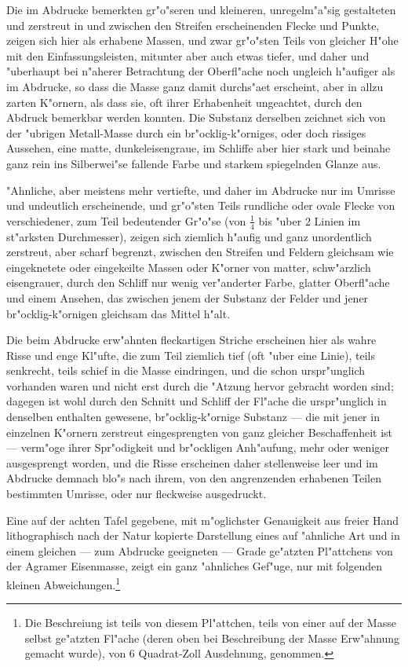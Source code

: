 \documentclass[a4paper, 11pt, oneside, german]{article}
\begin{document}
Die im Abdrucke bemerkten gr"o"seren und kleineren, unregelm"a"sig gestalteten und zerstreut in und zwischen den Streifen erscheinenden Flecke und Punkte, zeigen sich hier als erhabene Massen, und zwar gr"o"sten Teils von gleicher H"ohe mit den Einfassungsleisten, mitunter aber auch etwas tiefer, und daher und "uberhaupt bei n"aherer Betrachtung der Oberfl"ache noch ungleich h"aufiger als im Abdrucke, so dass die Masse ganz damit durchs"aet erscheint, aber in allzu zarten K"ornern, als dass sie, oft ihrer Erhabenheit ungeachtet, durch den Abdruck bemerkbar werden konnten. Die Substanz derselben zeichnet sich von der "ubrigen Metall-Masse durch ein br"ocklig-k"orniges, oder doch rissiges Aussehen, eine matte, dunkeleisengraue, im Schliffe aber hier stark und beinahe ganz rein ins Silberwei"se fallende Farbe und starkem spiegelnden Glanze aus.

"Ahnliche, aber meistens mehr vertiefte, und daher im Abdrucke nur im Umrisse und undeutlich erscheinende, und gr"o"sten Teils rundliche oder ovale Flecke von verschiedener, zum Teil bedeutender Gr"o"se (von $\frac{1}{4}$ bis "uber 2 Linien im st"arksten Durchmesser), zeigen sich ziemlich h"aufig und ganz unordentlich zerstreut, aber scharf begrenzt, zwischen den Streifen und Feldern gleichsam wie eingeknetete oder eingekeilte Massen oder K"orner von matter, schw"arzlich eisengrauer, durch den Schliff nur wenig ver"anderter Farbe, glatter Oberfl"ache und einem Ansehen, das zwischen jenem der Substanz der Felder und jener br"ocklig-k"ornigen gleichsam das Mittel h"alt.

Die beim Abdrucke erw"ahnten fleckartigen Striche erscheinen hier als wahre Risse und enge Kl"ufte, die zum Teil ziemlich tief (oft "uber eine Linie), teils senkrecht, teils schief in die Masse eindringen, und die schon urspr"unglich vorhanden waren und nicht erst durch die "Atzung hervor gebracht worden sind; dagegen ist wohl durch den Schnitt und Schliff der Fl"ache die urspr"unglich in denselben enthalten gewesene, br"ocklig-k"ornige Substanz --- die mit jener in einzelnen K"ornern zerstreut eingesprengten von ganz gleicher Beschaffenheit ist --- verm"oge ihrer Spr"odigkeit und br"ockligen Anh"aufung, mehr oder weniger ausgesprengt worden, und die Risse erscheinen daher stellenweise leer und im Abdrucke demnach blo"s nach ihrem, von den angrenzenden erhabenen Teilen bestimmten Umrisse, oder nur fleckweise ausgedruckt.

Eine auf der achten Tafel gegebene, mit m"oglichster Genauigkeit aus freier Hand lithographisch nach der Natur kopierte Darstellung eines auf "ahnliche Art und in einem gleichen --- zum Abdrucke geeigneten --- Grade ge"atzten Pl"attchens von der Agramer Eisenmasse, zeigt ein ganz "ahnliches Gef"uge, nur mit folgenden kleinen Abweichungen.\footnote{Die Beschreiung ist teils von diesem Pl"attchen, teils von einer auf der Masse selbst ge"atzten Fl"ache (deren oben bei Beschreibung der Masse Erw"ahnung gemacht wurde), von 6 Quadrat-Zoll Ausdehnung, genommen.}
\end{document}
